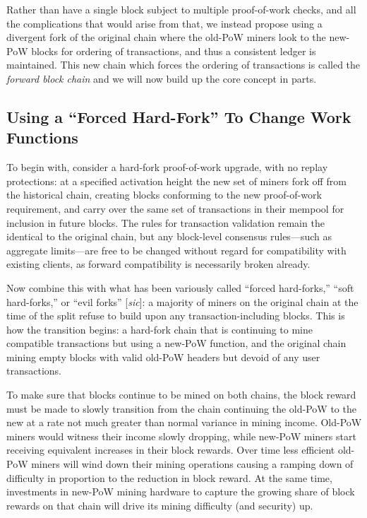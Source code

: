 Rather than have a single block subject to multiple proof-of-work
checks, and all the complications that would arise from that, we
instead propose using a divergent fork of the original chain where the
old-PoW miners look to the new-PoW blocks for ordering of
transactions, and thus a consistent ledger is maintained.  This new
chain which forces the ordering of transactions is called the
\emph{forward block chain} and we will now build up the core concept
in parts.

\subsection{Using a ``Forced Hard-Fork'' To Change Work Functions}

To begin with, consider a hard-fork proof-of-work upgrade, with no
replay protections: at a specified activation height the new set of
miners fork off from the historical chain, creating blocks conforming
to the new proof-of-work requirement, and carry over the same set of
transactions in their mempool for inclusion in future blocks.  The
rules for transaction validation remain the identical to the original
chain, but any block-level consensus rules---such as aggregate
limits---are free to be changed without regard for compatibility with
existing clients, as forward compatibility is necessarily broken
already.

Now combine this with what has been variously called ``forced
hard-forks,'' ``soft hard-forks,'' or ``evil forks'' [\emph{sic}]: a
majority of miners on the original chain at the time of the split
refuse to build upon any transaction-including blocks.  This is how
the transition begins: a hard-fork chain that is continuing to mine
compatible transactions but using a new-PoW function, and the original
chain mining empty blocks with valid old-PoW headers but devoid of any
user transactions.

To make sure that blocks continue to be mined on both chains, the
block reward must be made to slowly transition from the chain
continuing the old-PoW to the new at a rate not much greater than
normal variance in mining income.  Old-PoW miners would witness their
income slowly dropping, while new-PoW miners start receiving
equivalent increases in their block rewards.  Over time less efficient
old-PoW miners will wind down their mining operations causing a
ramping down of difficulty in proportion to the reduction in block
reward.  At the same time, investments in new-PoW mining hardware to
capture the growing share of block rewards on that chain will drive
its mining difficulty (and security) up.


